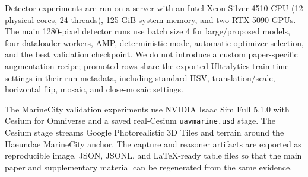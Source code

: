 Detector experiments are run on a server with an Intel Xeon Silver 4510 CPU
(12 physical cores, 24 threads), 125 GiB system memory, and two RTX 5090 GPUs.
The main 1280-pixel detector runs use batch size 4 for large/proposed models,
four dataloader workers, AMP, deterministic mode, automatic optimizer
selection, and the best validation checkpoint. We do not introduce a custom
paper-specific augmentation recipe; promoted rows share the exported
Ultralytics train-time settings in their run metadata, including standard HSV,
translation/scale, horizontal flip, mosaic, and close-mosaic settings.

The MarineCity validation experiments use NVIDIA Isaac Sim Full 5.1.0 with
Cesium for Omniverse and a saved real-Cesium \texttt{uavmarine.usd} stage. The
Cesium stage streams Google Photorealistic 3D Tiles and terrain around the
Haeundae MarineCity anchor. The capture and reasoner artifacts are exported as
reproducible image, JSON, JSONL, and LaTeX-ready table files so that the main
paper and supplementary material can be regenerated from the same evidence.
